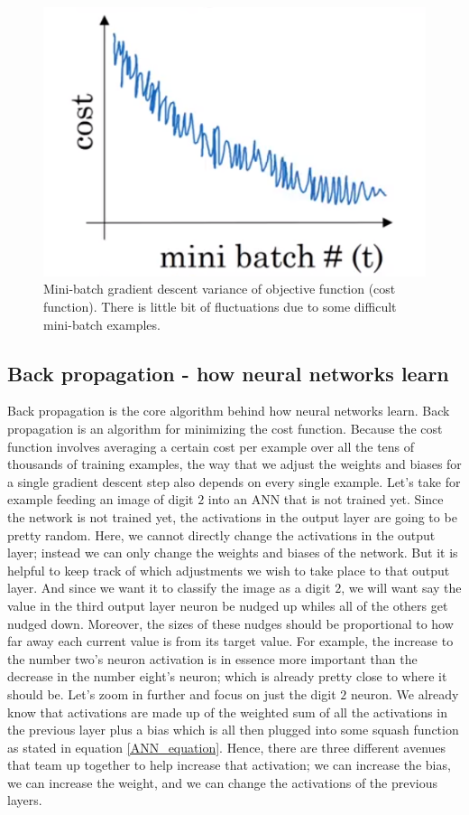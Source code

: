 \documentclass[master]{thesis-uestc}
\begin{document}
\begin{figure}[ht]
\includegraphics[width=5in]{pic/mini-batch.PNG}
\caption{Mini-batch gradient descent variance of objective function (cost function). There is little bit of fluctuations due to some difficult mini-batch examples.}
\label{mini-batch}
\end{figure}

\subsection{Back propagation - how neural networks learn}
Back propagation is the core algorithm behind how neural networks learn. Back propagation is an algorithm for minimizing the cost function. Because the cost function involves averaging a certain cost per example over all the tens of thousands of training examples, the way that we adjust the weights and biases for a single gradient descent step also depends on every single example. Let's take for example feeding an image of digit $2$ into an ANN that is not trained yet. Since the network is not trained yet, the activations in the output layer are going to be pretty random. Here, we cannot directly change the activations in the output layer; instead we can only change the weights and biases of the network. But it is helpful to keep track of which adjustments we wish to take place to that output layer. And since we want it to classify the image as a digit $2$, we will want say the value in the third output layer neuron be nudged up whiles all of the others get nudged down. Moreover, the sizes of these nudges should be proportional to how far away each current value is from its target value. For example, the increase to the number two's neuron activation is in essence more important than the decrease in the number eight's neuron; which is already pretty close to where it should be. Let's zoom in further and focus on just the digit $2$ neuron. We already know that activations are made up of the weighted sum of all the activations in the previous layer plus a bias which is all then plugged into some squash function as stated in equation \ref{ANN_equation}. Hence, there are three different avenues that team up together to help increase that activation; we can increase the bias, we can increase the weight, and we can change the activations of the previous layers.
\end{document}
